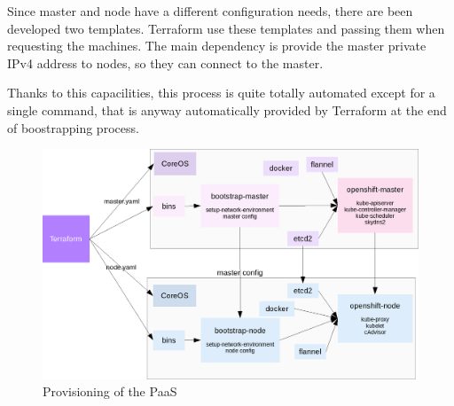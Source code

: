 Since master and node have a different configuration needs, there are
been developed two templates. Terraform use these templates and passing
them when requesting the machines. The main dependency is provide the
master private IPv4 address to nodes, so they can connect to the master.

Thanks to this capacilities, this process is quite totally automated
except for a single command, that is anyway automatically provided by
Terraform at the end of boostrapping process.

\begin{figure}[htbp]
\centering
\includegraphics{media/ch4-bootstrap.png}
\caption{Provisioning of the PaaS}
\end{figure}